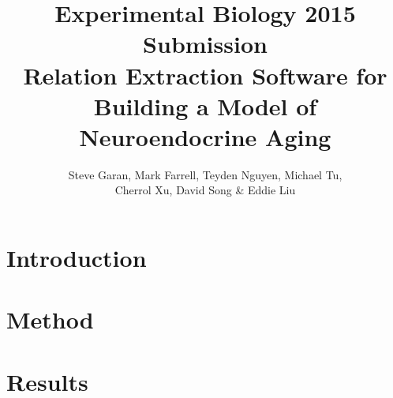 \documentclass[11pt]{article}
\begin{document}
\title{Experimental Biology 2015 Submission \\
  \small Relation Extraction Software for Building a Model of Neuroendocrine Aging
}

\author{Steve Garan, Mark Farrell, Teyden Nguyen, Michael Tu, \\ Cherrol Xu, David Song \& Eddie Liu}

\maketitle

\section{Introduction}










\section{Method}














\section{Results}













\end{document}

